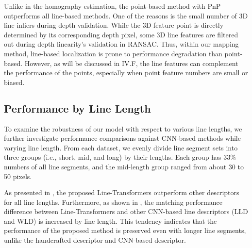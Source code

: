 \documentclass[letterpaper, 10 pt, journal, twoside]{ieeetran}
\begin{document}
Unlike in the homography estimation, the point-based method with \ac{PnP} outperforms all line-based methods. One of the reasons is the small number of 3D line inliers during depth validation. While the 3D feature point is directly determined by its corresponding depth pixel, some 3D line features are filtered out during depth linearity's validation in \ac{RANSAC}. Thus, within our mapping method, line-based localization is prone to performance degradation than point-based. However, as will be discussed in \textsection IV.F, the line features can complement the performance of the points, especially when point feature numbers are small or biased.



\subsection{Performance by Line Length}
\label{sec:length}

To examine the robustness of our model with respect to various line lengths, we further investigate performance comparisons against \ac{CNN}-based methods while varying line length. From each dataset, we evenly divide line segment sets into three groups (i.e., short, mid, and long) by their lengths. Each group has 33\% numbers of all line segments, and the mid-length group ranged from about 30 to 50 pixels.

As presented in , the proposed Line-Transformers outperform other descriptors for all line lengths. Furthermore, as shown in , the matching performance difference between Line-Transformers and other CNN-based line descriptors (\ac{LLD} and \ac{WLD}) is increased by line length. This tendency indicates that the performance of the proposed method is preserved even with longer line segments, unlike the handcrafted descriptor and CNN-based descriptor.
\end{document}
